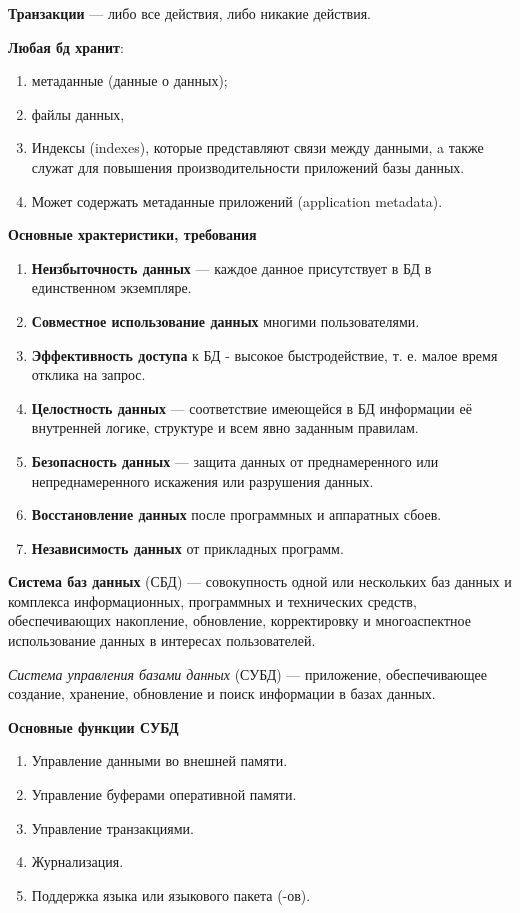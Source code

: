 \textbf{Транзакции} --- либо все действия, либо никакие действия.


\textbf{Любая бд хранит}:

\begin{enumerate}
	\item метаданные (данные о данных);
	\item файлы данных,
	\item Индексы (indexes), которые представляют связи между данными,  a также служат для повышения производительности приложений базы данных.
	\item Может содержать метаданные приложений (application metadata).
\end{enumerate}

\textbf{Основные храктеристики, требования}

\begin{enumerate}
	\item \textbf{Неизбыточность данных} --- каждое данное присутствует в БД в единственном экземпляре.
	\item \textbf{Совместное использование данных} многими пользователями.
	\item \textbf{Эффективность доступа} к БД - высокое быстродействие, т. е. малое время отклика на запрос.
	\item \textbf{Целостность данных} --- соответствие имеющейся в БД информации её внутренней логике, структуре и всем явно заданным правилам.
	\item \textbf{Безопасность данных} --- защита данных от преднамеренного или непреднамеренного искажения или разрушения данных.
	\item \textbf{Восстановление данных} после программных и аппаратных сбоев.
	\item \textbf{Независимость данных} от прикладных программ.
\end{enumerate}

\textbf{Система баз данных} (СБД) --- совокупность одной или нескольких баз данных и комплекса информационных, программных и технических средств, обеспечивающих накопление, обновление, корректировку и многоаспектное использование данных в интересах пользователей.

\textit{Система управления базами данных} (СУБД) --- приложение, обеспечивающее создание, хранение, обновление и поиск информации в базах данных.

\textbf{Основные функции СУБД}

\begin{enumerate}
	\item Управление данными во внешней памяти.
	\item Управление буферами оперативной памяти.
	\item Управление транзакциями.
	\item Журнализация.
	\item Поддержка языка или языкового пакета (-ов).
\end{enumerate}

